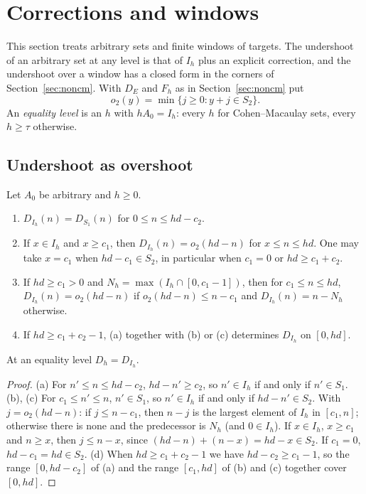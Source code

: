 \section{Corrections and windows}\label{sec:corrections}

This section treats arbitrary sets and finite windows of targets. The undershoot of an arbitrary set at any level is that of $I_h$ plus an explicit correction, and the undershoot over a window has a closed form in the corners of Section~\ref{sec:noncm}. With $D_E$ and $F_h$ as in Section~\ref{sec:noncm} put
\[
o_2(y)=\min\{j\ge0:y+j\in S_2\}.
\]
An \emph{equality level} is an $h$ with $hA_0=I_h$: every $h$ for Cohen--Macaulay sets, every $h\ge\tau$ otherwise.

\subsection{Undershoot as overshoot}\label{subsec:overshoot-form}

\begin{proposition}\label{prop:overshoot-form}
Let $A_0$ be arbitrary and $h\ge0$.
\begin{enumerate}
\item[(a)] $D_{I_h}(n)=D_{S_1}(n)$ for $0\le n\le hd-c_2$.
\item[(b)] If $x\in I_h$ and $x\ge c_1$, then $D_{I_h}(n)=o_2(hd-n)$ for $x\le n\le hd$. One may take $x=c_1$ when $hd-c_1\in S_2$, in particular when $c_1=0$ or $hd\ge c_1+c_2$.
\item[(c)] If $hd\ge c_1>0$ and $N_h=\max(I_h\cap[0,c_1-1])$, then for $c_1\le n\le hd$, $D_{I_h}(n)=o_2(hd-n)$ if $o_2(hd-n)\le n-c_1$ and $D_{I_h}(n)=n-N_h$ otherwise.
\item[(d)] If $hd\ge c_1+c_2-1$, (a) together with (b) or (c) determines $D_{I_h}$ on $[0,hd]$.
\end{enumerate}
At an equality level $D_h=D_{I_h}$.
\end{proposition}

\begin{proof}
(a) For $n'\le n\le hd-c_2$, $hd-n'\ge c_2$, so $n'\in I_h$ if and only if $n'\in S_1$. (b), (c) For $c_1\le n'\le n$, $n'\in S_1$, so $n'\in I_h$ if and only if $hd-n'\in S_2$. With $j=o_2(hd-n)$: if $j\le n-c_1$, then $n-j$ is the largest element of $I_h$ in $[c_1,n]$; otherwise there is none and the predecessor is $N_h$ (and $0\in I_h$). If $x\in I_h$, $x\ge c_1$ and $n\ge x$, then $j\le n-x$, since $(hd-n)+(n-x)=hd-x\in S_2$. If $c_1=0$, $hd-c_1=hd\in S_2$. (d) When $hd\ge c_1+c_2-1$ we have $hd-c_2\ge c_1-1$, so the range $[0,hd-c_2]$ of (a) and the range $[c_1,hd]$ of (b) and (c) together cover $[0,hd]$.
\end{proof}

